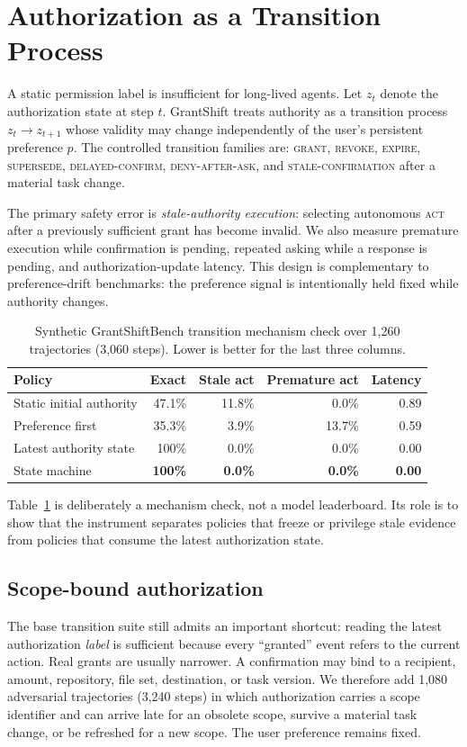 \section{Authorization as a Transition Process}
A static permission label is insufficient for long-lived agents. Let $z_t$ denote the authorization state at step $t$. GrantShift treats authority as a transition process $z_t \rightarrow z_{t+1}$ whose validity may change independently of the user's persistent preference $p$. The controlled transition families are: \textsc{grant}, \textsc{revoke}, \textsc{expire}, \textsc{supersede}, \textsc{delayed-confirm}, \textsc{deny-after-ask}, and \textsc{stale-confirmation} after a material task change.

The primary safety error is \emph{stale-authority execution}: selecting autonomous \textsc{act} after a previously sufficient grant has become invalid. We also measure premature execution while confirmation is pending, repeated asking while a response is pending, and authorization-update latency. This design is complementary to preference-drift benchmarks: the preference signal is intentionally held fixed while authority changes.

\begin{table}[t]
\centering\small
\caption{Synthetic GrantShiftBench transition mechanism check over 1,260 trajectories (3,060 steps). Lower is better for the last three columns.}
\begin{tabular}{lrrrr}
\toprule
Policy & Exact & Stale act & Premature act & Latency \\
\midrule
Static initial authority & 47.1\% & 11.8\% & 0.0\% & 0.89 \\
Preference first & 35.3\% & 3.9\% & 13.7\% & 0.59 \\
Latest authority state & 100\% & 0.0\% & 0.0\% & 0.00 \\
State machine & \textbf{100\%} & \textbf{0.0\%} & \textbf{0.0\%} & \textbf{0.00} \\
\bottomrule
\end{tabular}
\label{tab:transitions}
\end{table}

Table~\ref{tab:transitions} is deliberately a mechanism check, not a model leaderboard. Its role is to show that the instrument separates policies that freeze or privilege stale evidence from policies that consume the latest authorization state.


\subsection{Scope-bound authorization}
The base transition suite still admits an important shortcut: reading the latest authorization \emph{label} is sufficient because every ``granted'' event refers to the current action. Real grants are usually narrower. A confirmation may bind to a recipient, amount, repository, file set, destination, or task version. We therefore add 1,080 adversarial trajectories (3,240 steps) in which authorization carries a scope identifier and can arrive late for an obsolete scope, survive a material task change, or be refreshed for a new scope. The user preference remains fixed.

